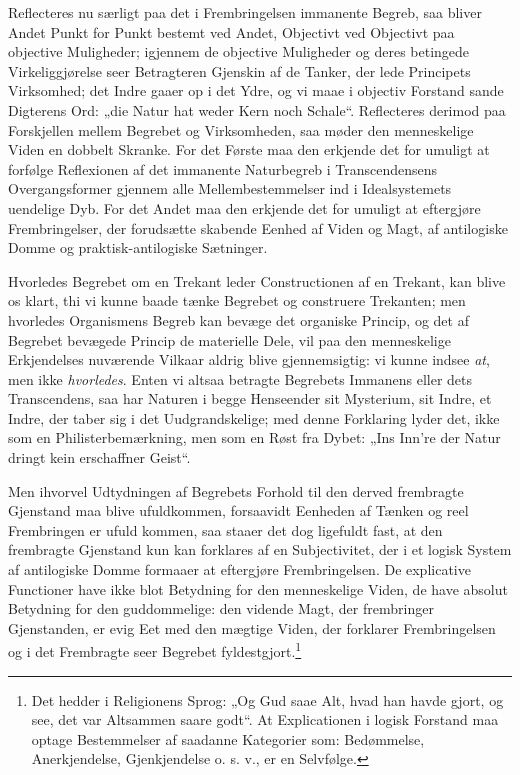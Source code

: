 \documentclass[12pt]{book}
\newcommand{\opage}[1]{\marginnote{\footnotesize\textit{[#1]}}}
\begin{document}
Reflecteres nu særligt paa det i Frembringelsen immanente
Begreb, saa bliver Andet Punkt for Punkt bestemt ved
Andet, Objectivt ved Objectivt paa objective Muligheder;
igjennem de objective Muligheder og deres betingede Virkeliggjørelse
seer Betragteren Gjenskin af de Tanker, der lede
Principets Virksomhed; det Indre gaaer op i det Ydre, og vi
maae i objectiv Forstand sande Digterens Ord: „die Natur
hat weder Kern noch Schale“. Reflecteres derimod paa Forskjellen
mellem Begrebet og Virksomheden, saa møder den
menneskelige Viden en dobbelt Skranke. For det Første maa
den erkjende det for umuligt at forfølge Reflexionen af det
immanente Naturbegreb i Transcendensens Overgangsformer
gjennem alle Mellembestemmelser ind i Idealsystemets uendelige
Dyb. For det Andet maa den erkjende det for umuligt
at eftergjøre Frembringelser, der forudsætte skabende Eenhed
af Viden og Magt, af antilogiske Domme og praktisk-antilogiske
Sætninger.

Hvorledes Begrebet om en Trekant leder Constructionen af
en Trekant, kan blive os klart, thi vi kunne baade tænke Begrebet
og construere Trekanten; men hvorledes Organismens Begreb kan
bevæge det organiske Princip, og det af Begrebet bevægede Princip
de materielle Dele, vil paa den menneskelige Erkjendelses nuværende
Vilkaar aldrig blive gjennemsigtig: vi kunne indsee \emph{at}, men
ikke \emph{hvorledes}. Enten vi altsaa betragte Begrebets Immanens
eller dets Transcendens, saa har Naturen i begge Henseender
sit Mysterium, sit Indre, et Indre, der taber sig i
det Uudgrandskelige; med denne Forklaring lyder det, ikke
som en Philisterbemærkning, men som en Røst fra Dybet:
„Ins Inn're der Natur dringt kein erschaffner Geist“.

Men ihvorvel Udtydningen af Begrebets Forhold til den
derved frembragte Gjenstand maa blive ufuldkommen, forsaavidt
Eenheden af Tænken og reel Frembringen er ufuld%
\opage{147}kommen, saa staaer det dog ligefuldt fast, at den frembragte
Gjenstand kun kan forklares af en Subjectivitet, der i et
logisk System af antilogiske Domme formaaer at eftergjøre
Frembringelsen. De explicative Functioner have ikke blot
Betydning for den menneskelige Viden, de have absolut Betydning
for den guddommelige: den vidende Magt, der frembringer
Gjenstanden, er evig Eet med den mægtige Viden,
der forklarer Frembringelsen og i det Frembragte seer Begrebet
fyldestgjort.\footnote{Det hedder i Religionens Sprog: „Og Gud saae Alt, hvad han
havde gjort, og see, det var Altsammen saare godt“. At Explicationen
i logisk Forstand maa optage Bestemmelser af saadanne Kategorier
som: Bedømmelse, Anerkjendelse, Gjenkjendelse o. s. v., er
en Selvfølge.} %
\end{document}
